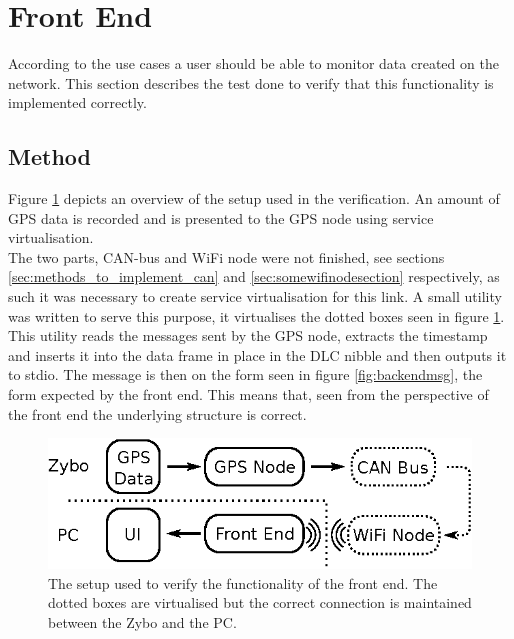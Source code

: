 
\section{Front End}
\label{sec:frontendverification}
According to the use cases a user should be able to monitor data created on the network.
This section describes the test done to verify that this functionality is implemented correctly.
\subsection{Method}
Figure \ref{fig:frontendsetup} depicts an overview of the setup used in the verification.
An amount of GPS data is recorded and is presented to the GPS node using service virtualisation.\\

The two parts, CAN-bus and WiFi node were not finished, see sections \ref{sec:methods_to_implement_can} and \ref{sec:somewifinodesection} respectively, as such it was necessary to create service virtualisation for this link.
A small utility was written to serve this purpose, it virtualises the dotted boxes seen in figure \ref{fig:frontendsetup}.
This utility reads the messages sent by the GPS node, extracts the timestamp and inserts it into the data frame in place in the DLC nibble and then outputs it to stdio.
The message is then on the form seen in figure \ref{fig:backendmsg}, the form expected by the front end.
This means that, seen from the perspective of the front end the underlying structure is correct.

\begin{figure}
	\centering
	\includegraphics[width=.75\linewidth]{graphics/frontend_verification}
	\caption{The setup used to verify the functionality of the front end. 
	The dotted boxes are virtualised but the correct connection is maintained between the Zybo and the PC.}
	\label{fig:frontendsetup}
\end{figure}


